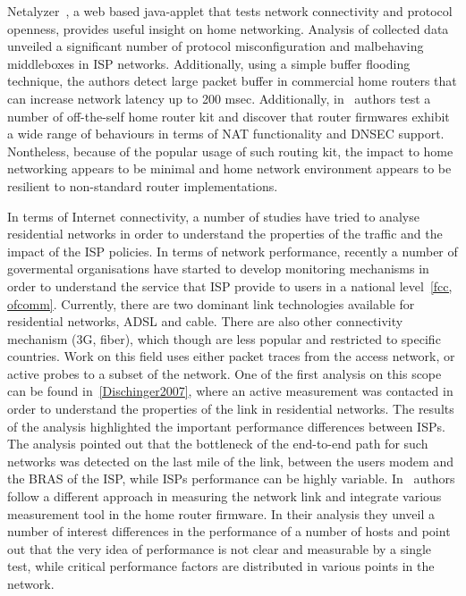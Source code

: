 Netalyzer~\cite{Kreibich20}, a web based java-applet that tests network
connectivity and protocol openness, provides useful insight on home networking.
Analysis of collected data unveiled a significant number of protocol
misconfiguration and malbehaving middleboxes in ISP networks. Additionally,
using a simple buffer flooding technique, the authors detect large packet buffer
in commercial home routers that can increase network latency up to 200 msec.
Additionally, in~\cite{Hatonen10} authors test a number of off-the-self home
router kit and discover that router firmwares exhibit a wide range of behaviours
in terms of NAT functionality and DNSEC support. Nontheless, because of the
popular usage of such routing kit, the impact to home networking appears to be
minimal and home network environment appears to be resilient to non-standard
router implementations. 

In terms of Internet connectivity, a number of studies have tried to analyse
residential networks in order to understand the properties of the traffic and
the impact of the ISP policies. In terms of network performance, recently a
number of govermental organisations have started to develop monitoring
mechanisms in order to understand the service that ISP provide to users in a
national level~\ref{fcc, ofcomm}. Currently, there are two dominant link
technologies available for residential networks, ADSL and cable. There are also
other connectivity mechanism (3G, fiber), which though are less popular and
restricted to specific countries. Work on this field uses either packet traces
from the access network, or active probes to a subset of the network. One of the
first analysis on this scope can be found in~\ref{Dischinger2007}, where an
active measurement was contacted in order to understand the properties of the
link in residential networks. The results of the analysis highlighted the
important performance differences between ISPs. The analysis pointed out that
the bottleneck of the end-to-end path for such networks was detected on the last
mile of the link, between the users modem and the BRAS of the ISP, while ISPs
performance can be highly variable. In~\cite{Sundaresan2011} authors follow a
different approach in measuring the network link and integrate various
measurement tool in the home  router firmware. In their analysis they
unveil a number of interest differences in the performance of a number of hosts
and point out that the very idea of performance is not clear and measurable by a
single test, while critical performance factors are distributed in various points
in the network. 

